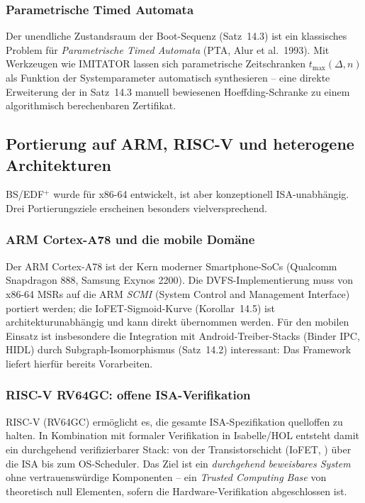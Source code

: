 ﻿\documentclass[a4paper,12pt]{scrreprt}
\theoremstyle{definition}
\begin{document}
	\subsubsection{Parametrische Timed Automata}
	
	Der unendliche Zustandsraum der Boot-Sequenz (Satz~14.3) ist ein klassisches
	Problem für \emph{Parametrische Timed Automata} (PTA, Alur et al.\ 1993).
	Mit Werkzeugen wie IMITATOR lassen sich parametrische Zeitschranken
	$t_{\max}(\Delta, n)$ als Funktion der Systemparameter automatisch synthesieren --
	eine direkte Erweiterung der in Satz~14.3 manuell bewiesenen
	Hoeffding-Schranke zu einem algorithmisch berechenbaren Zertifikat.
	
	\subsection{Portierung auf ARM, RISC-V und heterogene Architekturen}
	
	BS/EDF$^+$ wurde für x86-64 entwickelt, ist aber konzeptionell
	ISA-unabhängig. Drei Portierungsziele erscheinen besonders vielversprechend.
	
	\subsubsection{ARM Cortex-A78 und die mobile Domäne}
	
	Der ARM Cortex-A78 ist der Kern moderner Smartphone-SoCs
	(Qualcomm Snapdragon 888, Samsung Exynos 2200). Die DVFS-Implementierung
	muss von x86-64 MSRs auf die ARM \emph{SCMI} (System Control and
	Management Interface) portiert werden; die IoFET-Sigmoid-Kurve (Korollar~14.5)
	ist architekturunabhängig und kann direkt übernommen werden.
	Für den mobilen Einsatz ist insbesondere die Integration mit
	Android-Treiber-Stacks (Binder IPC, HIDL) durch Subgraph-Isomorphismus
	(Satz~14.2) interessant: Das Framework \cite{Epp2026mobde} liefert
	hierfür bereits Vorarbeiten.
	
	\subsubsection{RISC-V RV64GC: offene ISA-Verifikation}
	
	RISC-V (RV64GC) ermöglicht es, die gesamte ISA-Spezifikation quelloffen
	zu halten. In Kombination mit formaler Verifikation in Isabelle/HOL
	entsteht damit ein durchgehend verifizierbarer Stack: von der
	Transistorschicht (IoFET, \cite{Epp2026iono}) über die ISA bis zum
	OS-Scheduler. Das Ziel ist ein \emph{durchgehend beweisbares System}
	ohne vertrauenswürdige Komponenten -- ein \emph{Trusted Computing Base}
	von theoretisch null Elementen, sofern die Hardware-Verifikation
	abgeschlossen ist.
	
\end{document}
